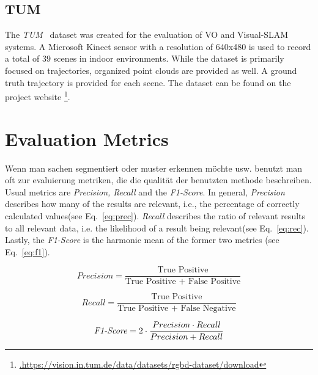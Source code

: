 \documentclass[main.tex]{subfiles}
\begin{document}
\subsection{TUM}
\label{subsec:bg-TUM}
The \textit{TUM}~\cite{sturm12iros} dataset was created for the evaluation of VO and Visual-SLAM systems.
A Microsoft Kinect sensor with a resolution of 640x480 is used to record a total of 39 scenes in indoor environments.
While the dataset is primarily focused on trajectories, organized point clouds are provided as well. A ground
truth trajectory is provided for each scene.
The dataset can be found on the project website \footnote{\href{https://vision.in.tum.de/data/datasets/rgbd-dataset/download}{.https://vision.in.tum.de/data/datasets/rgbd-dataset/download}}.

\section{Evaluation Metrics}
\label{sec:metrics}
Wenn man sachen segmentiert oder muster erkennen möchte usw. benutzt man oft zur evaluierung metriken, die die qualität der benutzten methode beschreiben.
Usual metrics are \textit{Precision, Recall} and the \textit{F1-Score}.
In general, \textit{Precision} describes how many of the results are relevant, i.e., the percentage of correctly calculated values(see Eq.~\ref{eq:prec}). \textit{Recall} describes the ratio of relevant results to all relevant data, i.e.
the likelihood of a result being relevant(see Eq.~\ref{eq:rec}). Lastly, the \textit{F1-Score} is the harmonic mean of the former two metrics (see Eq.~\ref{eq:f1}).

\begin{equation}
    Precision = \frac{\text{True Positive}}{\text{True Positive + False Positive}}
    \label{eq:prec}
\end{equation}

\begin{equation}
    Recall = \frac{\text{True Positive}}{\text{True Positive + False Negative}}
    \label{eq:rec}
\end{equation}

\begin{equation}
    \text{\textit{F1-Score}} = 2 \cdot\frac{Precision\cdot Recall}{Precision + Recall}
    \label{eq:f1}
\end{equation}
\end{document}
